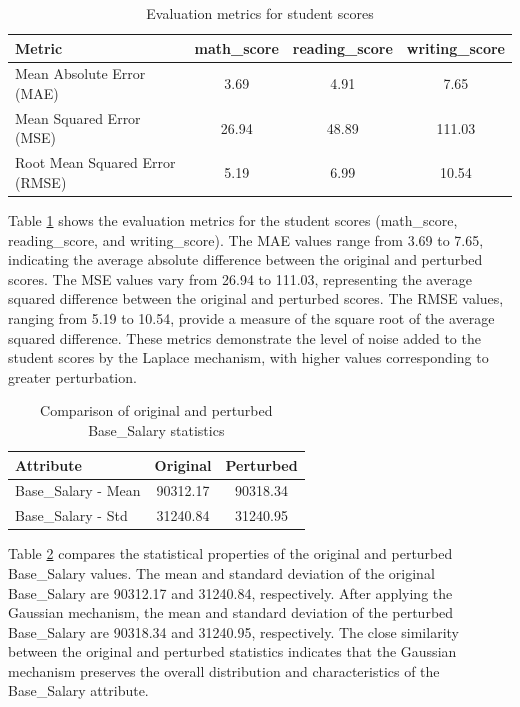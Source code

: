 \begin{table}[H]
\centering
\begin{tabular}{l|c|c|c}
\hline
\textbf{Metric} & \textbf{math\_score} & \textbf{reading\_score} & \textbf{writing\_score} \\
\hline
Mean Absolute Error (MAE) & 3.69 & 4.91 & 7.65 \\
Mean Squared Error (MSE) & 26.94 & 48.89 & 111.03 \\
Root Mean Squared Error (RMSE) & 5.19 & 6.99 & 10.54 \\
\hline
\end{tabular}
\caption{Evaluation metrics for student scores}
\label{tab:student_scores_metrics}
\end{table}
Table \ref{tab:student_scores_metrics} shows the evaluation metrics for the student scores (math\_score, reading\_score, and writing\_score). The MAE values range from 3.69 to 7.65, indicating the average absolute difference between the original and perturbed scores. The MSE values vary from 26.94 to 111.03, representing the average squared difference between the original and perturbed scores. The RMSE values, ranging from 5.19 to 10.54, provide a measure of the square root of the average squared difference. These metrics demonstrate the level of noise added to the student scores by the Laplace mechanism, with higher values corresponding to greater perturbation.

\begin{table}[H]
\centering
\begin{tabular}{l|c|c}
\hline
\textbf{Attribute} & \textbf{Original} & \textbf{Perturbed} \\
\hline
Base\_Salary - Mean & 90312.17 & 90318.34 \\
Base\_Salary - Std & 31240.84 & 31240.95 \\
\hline
\end{tabular}
\caption{Comparison of original and perturbed Base\_Salary statistics}
\label{tab:base_salary_distribution}
\end{table}
Table \ref{tab:base_salary_distribution} compares the statistical properties of the original and perturbed Base\_Salary values. The mean and standard deviation of the original Base\_Salary are 90312.17 and 31240.84, respectively. After applying the Gaussian mechanism, the mean and standard deviation of the perturbed Base\_Salary are 90318.34 and 31240.95, respectively. The close similarity between the original and perturbed statistics indicates that the Gaussian mechanism preserves the overall distribution and characteristics of the Base\_Salary attribute.

